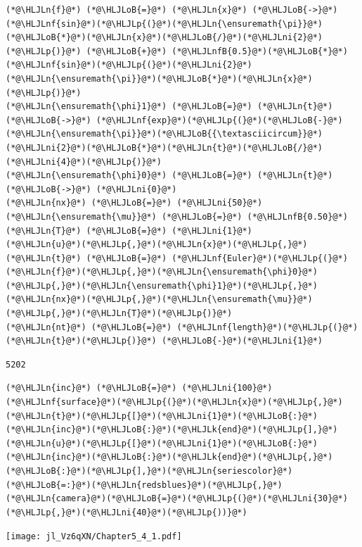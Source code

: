 \documentclass[12pt,a4paper]{article}
\newcommand{\HLJLk}[1]{\textcolor[RGB]{148,91,176}{\textbf{#1}}}
\newcommand{\HLJLn}[1]{#1}
\newcommand{\HLJLnf}[1]{\textcolor[RGB]{66,102,213}{#1}}
\newcommand{\HLJLnfB}[1]{\textcolor[RGB]{59,151,46}{#1}}
\newcommand{\HLJLni}[1]{\textcolor[RGB]{59,151,46}{#1}}
\newcommand{\HLJLoB}[1]{\textcolor[RGB]{102,102,102}{\textbf{#1}}}
\newcommand{\HLJLp}[1]{#1}
\begin{document}
\begin{lstlisting}
(*@\HLJLn{f}@*) (*@\HLJLoB{=}@*) (*@\HLJLn{x}@*) (*@\HLJLoB{->}@*) (*@\HLJLnf{sin}@*)(*@\HLJLp{(}@*)(*@\HLJLn{\ensuremath{\pi}}@*)(*@\HLJLoB{*}@*)(*@\HLJLn{x}@*)(*@\HLJLoB{/}@*)(*@\HLJLni{2}@*)(*@\HLJLp{)}@*) (*@\HLJLoB{+}@*) (*@\HLJLnfB{0.5}@*)(*@\HLJLoB{*}@*)(*@\HLJLnf{sin}@*)(*@\HLJLp{(}@*)(*@\HLJLni{2}@*)(*@\HLJLn{\ensuremath{\pi}}@*)(*@\HLJLoB{*}@*)(*@\HLJLn{x}@*)(*@\HLJLp{)}@*)
(*@\HLJLn{\ensuremath{\phi}1}@*) (*@\HLJLoB{=}@*) (*@\HLJLn{t}@*) (*@\HLJLoB{->}@*) (*@\HLJLnf{exp}@*)(*@\HLJLp{(}@*)(*@\HLJLoB{-}@*)(*@\HLJLn{\ensuremath{\pi}}@*)(*@\HLJLoB{{\textasciicircum}}@*)(*@\HLJLni{2}@*)(*@\HLJLoB{*}@*)(*@\HLJLn{t}@*)(*@\HLJLoB{/}@*)(*@\HLJLni{4}@*)(*@\HLJLp{)}@*)
(*@\HLJLn{\ensuremath{\phi}0}@*) (*@\HLJLoB{=}@*) (*@\HLJLn{t}@*) (*@\HLJLoB{->}@*) (*@\HLJLni{0}@*)
(*@\HLJLn{nx}@*) (*@\HLJLoB{=}@*) (*@\HLJLni{50}@*)
(*@\HLJLn{\ensuremath{\mu}}@*) (*@\HLJLoB{=}@*) (*@\HLJLnfB{0.50}@*)
(*@\HLJLn{T}@*) (*@\HLJLoB{=}@*) (*@\HLJLni{1}@*)
(*@\HLJLn{u}@*)(*@\HLJLp{,}@*)(*@\HLJLn{x}@*)(*@\HLJLp{,}@*)(*@\HLJLn{t}@*) (*@\HLJLoB{=}@*) (*@\HLJLnf{Euler}@*)(*@\HLJLp{(}@*)(*@\HLJLn{f}@*)(*@\HLJLp{,}@*)(*@\HLJLn{\ensuremath{\phi}0}@*)(*@\HLJLp{,}@*)(*@\HLJLn{\ensuremath{\phi}1}@*)(*@\HLJLp{,}@*)(*@\HLJLn{nx}@*)(*@\HLJLp{,}@*)(*@\HLJLn{\ensuremath{\mu}}@*)(*@\HLJLp{,}@*)(*@\HLJLn{T}@*)(*@\HLJLp{)}@*)
(*@\HLJLn{nt}@*) (*@\HLJLoB{=}@*) (*@\HLJLnf{length}@*)(*@\HLJLp{(}@*)(*@\HLJLn{t}@*)(*@\HLJLp{)}@*) (*@\HLJLoB{-}@*)(*@\HLJLni{1}@*)
\end{lstlisting}

\begin{lstlisting}
5202
\end{lstlisting}


\begin{lstlisting}
(*@\HLJLn{inc}@*) (*@\HLJLoB{=}@*) (*@\HLJLni{100}@*)
(*@\HLJLnf{surface}@*)(*@\HLJLp{(}@*)(*@\HLJLn{x}@*)(*@\HLJLp{,}@*)(*@\HLJLn{t}@*)(*@\HLJLp{[}@*)(*@\HLJLni{1}@*)(*@\HLJLoB{:}@*)(*@\HLJLn{inc}@*)(*@\HLJLoB{:}@*)(*@\HLJLk{end}@*)(*@\HLJLp{],}@*)(*@\HLJLn{u}@*)(*@\HLJLp{[}@*)(*@\HLJLni{1}@*)(*@\HLJLoB{:}@*)(*@\HLJLn{inc}@*)(*@\HLJLoB{:}@*)(*@\HLJLk{end}@*)(*@\HLJLp{,}@*)(*@\HLJLoB{:}@*)(*@\HLJLp{],}@*)(*@\HLJLn{seriescolor}@*)(*@\HLJLoB{=:}@*)(*@\HLJLn{redsblues}@*)(*@\HLJLp{,}@*) (*@\HLJLn{camera}@*)(*@\HLJLoB{=}@*)(*@\HLJLp{(}@*)(*@\HLJLni{30}@*)(*@\HLJLp{,}@*)(*@\HLJLni{40}@*)(*@\HLJLp{))}@*)
\end{lstlisting}

\texttt{[image: jl\_Vz6qXN/Chapter5\_4\_1.pdf]}
\end{document}
